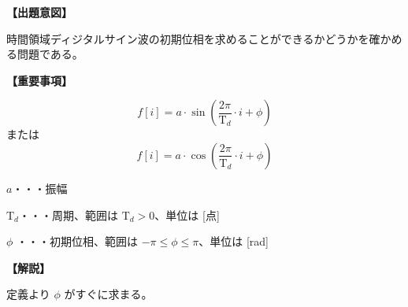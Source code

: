 \noindent \textbf{【出題意図】}

\bigskip
\noindent 時間領域ディジタルサイン波の初期位相を求めることができるかどうかを確かめる問題である。

\vspace{1em}
\noindent \textbf{【重要事項】}

\[
f[i] = a \cdot \sin \left ( \frac{2 \pi}{\textrm{T}_d}  \cdot i + \phi \right )
\]
%
\noindent または
%
\[
f[i] = a \cdot \cos \left ( \frac{2 \pi}{\textrm{T}_d}  \cdot i + \phi \right )
\]

\bigskip
\noindent $a$・・・振幅

\bigskip
\noindent $\textrm{T}_d$・・・周期、範囲は $\textrm{T}_d > 0$、単位は [点]

\bigskip
\noindent $\phi$ ・・・初期位相、範囲は $-\pi \leq \phi \leq \pi$、単位は [rad]


\vspace{1em}
\noindent \textbf{【解説】}

\bigskip
\noindent 定義より $\phi$ がすぐに求まる。
